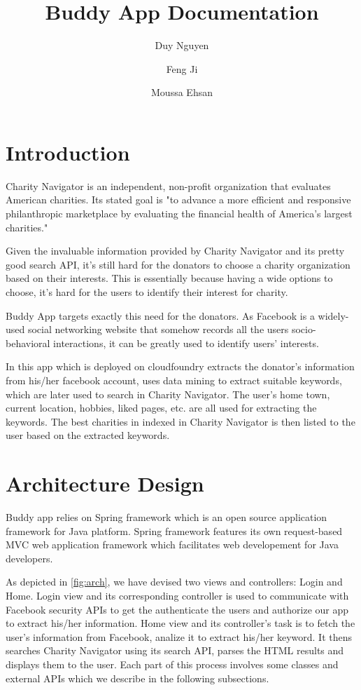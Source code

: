 \documentclass{article}
\begin{document}
\title{Buddy App Documentation	}


\author{
Duy Nguyen
\and
Feng Ji
\and
Moussa Ehsan
}

\maketitle

\section{Introduction}
Charity Navigator is an independent, non-profit organization that evaluates American charities. Its stated goal is "to advance a more efficient and responsive philanthropic marketplace by evaluating the financial health of America's largest charities."

Given the invaluable information provided by Charity Navigator and its pretty good search API, it's still hard for the donators to choose a charity organization based on their interests. This is essentially because having a wide options to choose, it's hard for the users to identify their interest for charity. 

Buddy App targets exactly this need for the donators. As Facebook is a widely-used social networking website that somehow records all the users socio-behavioral interactions, it can be greatly used to identify users' interests. 

In this app which is deployed on cloudfoundry extracts the donator's information from his/her facebook account, uses data mining to extract suitable keywords, which are later used to search in Charity Navigator. The user's home town, current location, hobbies, liked pages, etc. are all used for extracting the keywords. The best charities in indexed in Charity Navigator is then listed to the user based on the extracted keywords.

\section{Architecture Design}
Buddy app relies on Spring framework which is an open source application framework for Java platform. Spring framework features its own request-based MVC web application framework which facilitates web developement for Java developers.

As depicted in \ref{fig:arch}, we have devised two views and controllers: Login and Home. Login view and its corresponding controller is used to communicate with Facebook security APIs to get the authenticate the users and authorize our app to extract his/her information. Home view and its controller's task is to fetch the user's information from Facebook, analize it to extract his/her keyword. It thens searches Charity Navigator using its search API, parses the HTML results and displays them to the user. Each part of this process involves some classes and external APIs which we describe in the following subsections.
\end{document}
